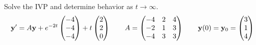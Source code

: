 \documentclass[11pt,letterpaper]{article}
\begin{document}
Solve the IVP and determine behavior as $t\to\infty$. 
\[
  \mathbf{y}'=A\mathbf{y}+e^{-2t}\begin{pmatrix}-4\\-4\\-4\end{pmatrix}
  +t\begin{pmatrix}2\\2\\0\end{pmatrix}
  \qquad A=\begin{pmatrix}-4&2&4\\-2&1&3\\-4&3&3\end{pmatrix}
  \qquad\mathbf{y}(0)=\mathbf{y}_0=\begin{pmatrix}3\\1\\4\end{pmatrix}
\]
\begingroup
\renewcommand{\labelenumi}{\textbf{\alph{enumi}.}}
\setlength{\leftmargini}{1.4em}
\end{document}
